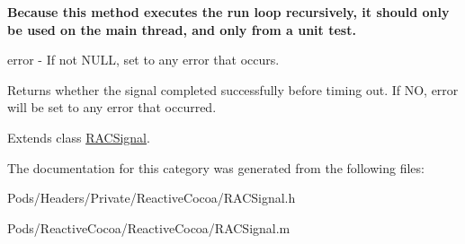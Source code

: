 {\bfseries Because this method executes the run loop recursively, it should only be used on the main thread, and only from a unit test.}

error -\/ If not N\+U\+LL, set to any error that occurs.

Returns whether the signal completed successfully before timing out. If NO, {\ttfamily error} will be set to any error that occurred. 

Extends class \mbox{\hyperlink{interface_r_a_c_signal_a29ac4be53792963e1c7e5c59e545e6cd}{R\+A\+C\+Signal}}.



The documentation for this category was generated from the following files\+:\begin{DoxyCompactItemize}
\item 
Pods/\+Headers/\+Private/\+Reactive\+Cocoa/R\+A\+C\+Signal.\+h\item 
Pods/\+Reactive\+Cocoa/\+Reactive\+Cocoa/R\+A\+C\+Signal.\+m\end{DoxyCompactItemize}
